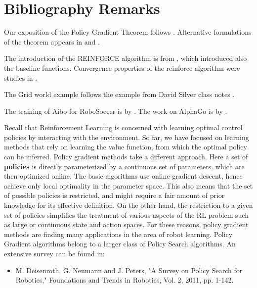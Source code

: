 \section{Bibliography Remarks}


Our exposition of the Policy Gradient Theorem follows \cite{SuttonMSM99}. Alternative formulations of the theorem appears in \cite{MarbachT01,MarbachT03} and \cite{BaxterB01}.

The introduction of the REINFORCE algorithm is from \cite{Williams92}, which introduced also the baseline functions. Convergence properties of the reinforce algorithm were studies in \cite{PhansalkarT95}.

The Grid world example follows the example from David Silver class notes \cite{SilverClass}.

The training of Aibo for RoboSoccer is by \cite{KohlS04}.
The work on AlphaGo is by \cite{SilverHMGSDSAPL16}.



Recall that Reinforcement Learning is concerned with learning optimal control policies by interacting with the environment. So far, we have focused on learning methods that rely on learning the value function, from which the optimal policy can be inferred.
Policy gradient methods take a different approach. Here a set of \textbf{policies} is directly parameterized by a continuous set of parameters, which are then optimized online. The basic algorithms use online gradient descent, hence achieve only local optimality in the parameter space.
This also means that the set of possible policies is restricted, and might require a fair amount of prior knowledge for its effective definition. On the other hand, the restriction to a given set of policies simplifies the treatment of various aspects of the RL problem such as large or continuous state and action spaces. For these reasons, policy gradient methods are finding many applications in the area of robot learning.
Policy Gradient algorithms belong to a larger class of Policy Search algorithms. An extensive survey can be found in:
\begin{itemize}
  \item M. Deisenroth, G. Neumann and J. Peters, "A Survey on Policy Search for Robotics," Foundations and Trends in Robotics, Vol. 2, 2011, pp. 1-142.
\end{itemize}
%

